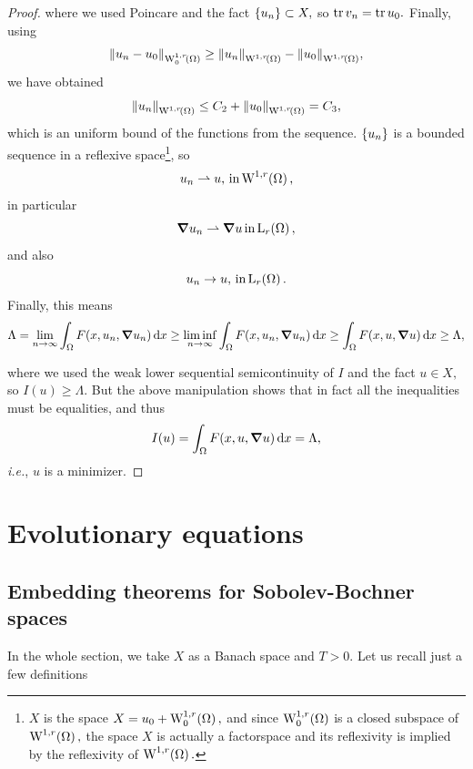 \documentclass{article}
\begin{document}
\begin{proof}
where we used Poincare and the fact $\qty{u_n} \subset X,$ so $\trace v_n = \trace u_0.$ Finally, using
\[
	\norm{u_n - u_0}_{\WkpzeroSet[1][r]{\Omega}} \geq \norm{u_n}_{\WkpSet[1][r]{\Omega}} - \norm{u_0}_{\WkpSet[1][r]{\Omega}},
\]
we have obtained
\[
	\norm{u_n}_{\WkpSet[1][r]{\Omega}} \leq C_2 + \norm{u_0}_{\WkpSet[1][r]{\Omega}} = C_3,
\]
which is an uniform bound of the functions from the sequence.  $\qty{u_n}$ is a bounded sequence in a reflexive space\footnote{$X$ is the space $X = u_0 + \WkpzeroSet[1][r]{\Omega},$ and since $\WkpzeroSet[1][r]{\Omega}$ is a closed subspace of $\WkpSet[1][r]{\Omega},$ the space $X$ is actually a factorspace and its reflexivity is implied by the reflexivity of $\WkpSet[1][r]{\Omega}.$}, so
    \[
	    u_n \rightharpoonup u, \, \text{in} \, \WkpSet[1][r]{\Omega},
    \]
    in particular
    \[
	    \grad u_n \rightharpoonup \grad u \, \text{in} \, \LpSet[r]{\Omega},
    \]
    and also
    \[
	    u_n \to u, \, \text{in} \, \LpSet[r]{\Omega}.
    \]
Finally, this means
\[
	\Lambda = \lim_{n \to \infty} \int_{\Omega}F\qty(x, u_n, \grad u_n)\dd{x} \geq \liminf_{n \to \infty} \int_{\Omega}F\qty(x, u_n, \grad u_n)\dd{x} \geq \int_{\Omega}F\qty(x, u, \grad u)\dd{x} \geq \Lambda,
\]

where we used the weak lower sequential semicontinuity of $I$ and the fact $u \in X,$ so $I(u) \geq \Lambda.$ But the above manipulation shows that in fact all the inequalities must be equalities, and thus
\[
	I(u) = \int_{\Omega}F\qty(x, u, \grad u)\dd{x} = \Lambda,
\]
\textit{i.e.}, $u$ is a minimizer.
\end{proof}
\section{Evolutionary equations}
\label{sec:evolutionray_eqs}

\subsection{Embedding theorems for Sobolev-Bochner spaces}
\label{sec:Sobolev-Bochner}
In the whole section, we take $X$ as a Banach space and $T>0.$ Let us recall just a few definitions
\end{document}
